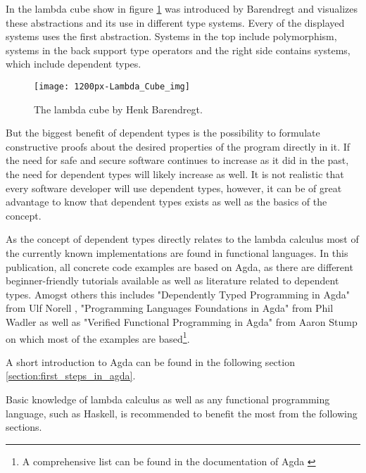 In the lambda cube show in figure \ref{fig:lambda_cube} was introduced by Barendregt \cite{lambda_cube} and visualizes these abstractions and its use in different type systems. Every of the displayed systems uses the first abstraction. Systems in the top include polymorphism, systems in the back support type operators and the right side contains systems, which include dependent types.
\begin{figure}[h]
\centering
\texttt{[image: 1200px-Lambda\_Cube\_img]}
\caption{The lambda cube by Henk Barendregt.}
\label{fig:lambda_cube}
\end{figure}

But the biggest benefit of dependent types is the possibility to formulate constructive proofs about the desired properties of the program directly in it.
If the need for safe and secure software continues to increase as it did in the past, the need for dependent types will likely increase as well.
It is not realistic that every software developer will use dependent types, however, it can be of great advantage to know that dependent types exists as well as the basics of the concept.

As the concept of dependent types directly relates to the lambda calculus most of the currently known implementations are found in functional languages.
In this publication, all concrete code examples are based on Agda, as there are different beginner-friendly tutorials available as well as literature related to dependent types. Amogst others this includes "Dependently Typed Programming in Agda" from Ulf Norell \cite{norell:deptyped}, "Programming Languages Foundations in Agda" from Phil Wadler \cite{plfa2019} as well as "Verified Functional Programming in Agda" from Aaron Stump \cite{10.1145/2841316} on which most of the examples are based\footnote{A comprehensive list can be found in the documentation of Agda \cite{AgdaReadTheDocs}}.

A short introduction to Agda can be found in the following section \ref{section:first_steps_in_agda}.

Basic knowledge of lambda calculus as well as any functional programming language, such as Haskell, is recommended to benefit the most from the following sections.
